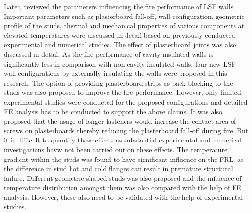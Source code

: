 Later, \citet{Kesawan2018} reviewed the parameters influencing the fire performance of LSF walls. Important parameters such as plasterboard fall-off, wall configuration, geometric profile of the studs, thermal and mechanical properties of various components at elevated temperatures were discussed in detail based on previously conducted experimental and numerical studies. The effect of plasterboard joints was also discussed in detail. As the fire performance of cavity insulated walls is significantly less in comparison with non-cavity insulated walls, four new LSF wall configurations by externally insulating the walls were proposed in this research. The option of providing plasterboard strips as back blocking to the studs was also proposed to improve the fire performance. However, only limited experimental studies were conducted for the proposed configurations and detailed FE analysis has to be conducted to support the above claims. It was also proposed that the usage of longer fasteners would increase the contact area of screws on plasterboards thereby reducing the plasterboard fall-off during fire. But it is difficult to quantify these effects as substantial experimental and numerical investigations havw not been carried out on these effects. The temperature gradient within the studs was found to have significant influence on the FRL, as the difference in stud hot and cold flanges can result in premature structural failure. Different geometric shaped studs was also proposed and the influence of temperature distribution amongst them was also compared with the help of FE analysis. However, these also need to be validated with the help of experimental studies.

